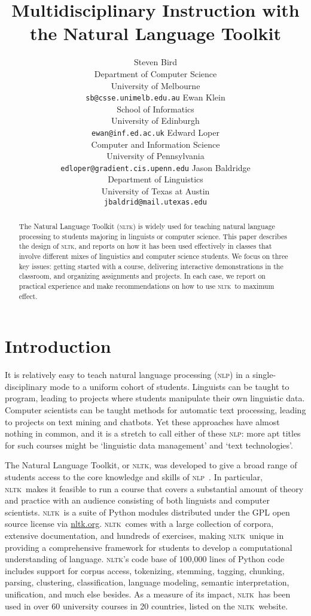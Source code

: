 \documentclass[11pt]{article}
\title{Multidisciplinary Instruction with the Natural Language Toolkit}
\author{Steven Bird \\
  Department of Computer Science\\
  University of Melbourne\\
  {\small\tt sb@csse.unimelb.edu.au} \And
  Ewan Klein\\
  School of Informatics\\
  University of Edinburgh\\
  {\small\tt ewan@inf.ed.ac.uk} \AND
  Edward Loper\\
  Computer and Information Science\\
  University of Pennsylvania\\
  {\small\tt edloper@gradient.cis.upenn.edu} \And
  Jason Baldridge\\
  Department of Linguistics\\
  University of Texas at Austin\\
  {\small\tt jbaldrid@mail.utexas.edu}
}
\date{}
\newcommand{\NLP}{\textsc{nlp}}
\newcommand{\NLTK}{\textsc{nltk}}
\begin{document}
\maketitle

\begin{abstract}
  The Natural Language Toolkit (\NLTK) is widely used for teaching
  natural language processing to students majoring in linguists or
  computer science.  This paper describes the design of \NLTK, and
  reports on how it has been used effectively in classes that involve
  different mixes of
  linguistics and computer science students.  We focus
  on three key issues: getting started with a course, delivering
  interactive demonstrations in the classroom,
  and organizing assignments and projects.
  In each case, we report on practical experience and make
  recommendations on how to use \NLTK\ to maximum effect.
\end{abstract}

\section{Introduction}

It is relatively easy to teach natural language processing (\NLP) in a
single-disciplinary mode to a uniform cohort of students.  Linguists
can be taught to program, leading to projects where students
manipulate their own linguistic data.  Computer scientists can be
taught methods for automatic text processing, leading to projects on
text mining and chatbots.  Yet these approaches have almost nothing in
common, and it is a stretch to call either of these \NLP: more apt
titles for such courses might be `linguistic data management' and
`text technologies'.

The Natural Language Toolkit, or \NLTK, was
developed to give a broad range of students access to the core
knowledge and skills of \NLP\ \cite{LoperBird02}.  In particular, \NLTK\ makes it feasible
to run a course that covers a substantial amount of theory and
practice with an audience consisting of both linguists and computer
scientists.  \NLTK\ is a suite of Python modules distributed under the
GPL open source license via \url{nltk.org}.  \NLTK\ comes with a large collection of
corpora, extensive documentation, and hundreds of exercises, making
\NLTK\ unique in providing a comprehensive framework for students to
develop a computational understanding of language.  \NLTK's code base
of 100,000 lines of Python code includes support for corpus access,
tokenizing, stemming, tagging, chunking, parsing, clustering,
classification, language modeling, semantic interpretation,
unification, and much else besides.  As a measure of its
impact, \NLTK\ has been used in over 60 university courses in 20
countries, listed on the \NLTK\ website.
\end{document}
